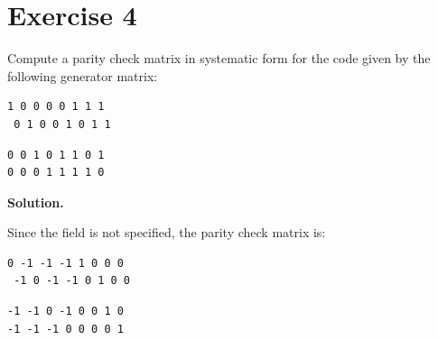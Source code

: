 \documentclass[11pt]{article}
\begin{document}
\section*{Exercise 4}
\begin{exercisebox}
Compute a parity check matrix in systematic form for the code given by the following generator matrix:

\begin{Verbatim}[fontsize=\small]
1 0 0 0 0 1 1 1
 0 1 0 0 1 0 1 1
\end{Verbatim}
\begin{Verbatim}[fontsize=\small]
0 0 1 0 1 1 0 1
0 0 0 1 1 1 1 0
\end{Verbatim}
\end{exercisebox}
\begin{solutionbox}
\textbf{Solution.}

Since the field is not specified, the parity check matrix is:

\begin{Verbatim}[fontsize=\small]
0 -1 -1 -1 1 0 0 0
 -1 0 -1 -1 0 1 0 0
\end{Verbatim}
\begin{Verbatim}[fontsize=\small]
-1 -1 0 -1 0 0 1 0
-1 -1 -1 0 0 0 0 1
\end{Verbatim}
\end{solutionbox}
\end{document}
